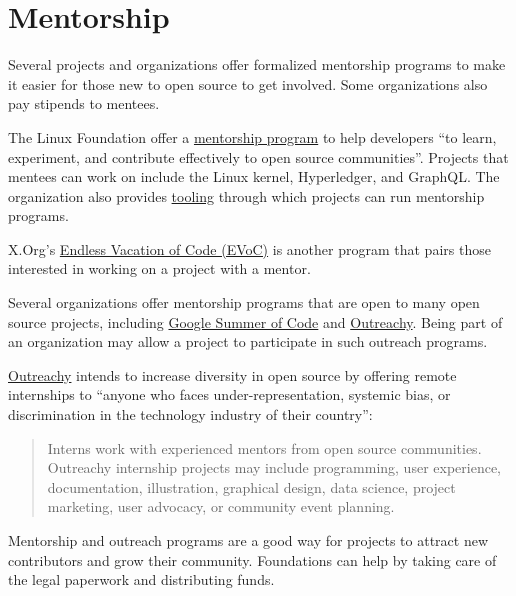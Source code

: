 


\chapter{Mentorship}

Several projects and organizations offer formalized mentorship programs to make it easier for those new to open source to get involved.  Some organizations also pay stipends to mentees.

The Linux Foundation offer a \href{https://www.linuxfoundation.org/en/about/diversity-inclusivity/mentorship/}{mentorship program} to help developers ``to learn, experiment, and contribute effectively to open source communities''.  Projects that mentees can work on include the Linux kernel, Hyperledger, and GraphQL.  The organization also provides \href{https://lfx.linuxfoundation.org/tools/mentorship}{tooling} through which projects can run mentorship programs.

X.Org's \href{https://www.x.org/wiki/XorgEVoC/}{Endless Vacation of Code (EVoC)} is another program that pairs those interested in working on a project with a mentor.

Several organizations offer mentorship programs that are open to many open source projects, including \href{https://summerofcode.withgoogle.com/}{Google Summer of Code} and \href{https://www.outreachy.org/}{Outreachy}.  Being part of an organization may allow a project to participate in such outreach programs.

\begin{kaobox}[frametitle=Outreachy: increasing diversity in open source]

\href{https://www.outreachy.org/}{Outreachy} intends to increase diversity in open source by offering remote internships to ``anyone who faces under-representation, systemic bias, or discrimination in the technology industry of their country'':

\begin{quote}

Interns work with experienced mentors from open source communities. Outreachy internship projects may include programming, user experience, documentation, illustration, graphical design,  data science, project marketing, user advocacy, or community event planning.

\end{quote}

\end{kaobox}

Mentorship and outreach programs are a good way for projects to attract new contributors and grow their community.  Foundations can help by taking care of the legal paperwork and distributing funds.

